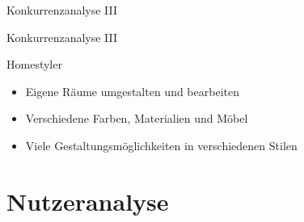 \documentclass[presentation,bigger,aspectratio=169]{beamer}
\begin{document}
\begin{frame}[label={sec:org63a1db3}]{Konkurrenzanalyse III}
\end{frame}
\begin{frame}[label={sec:orgee51e5f}]{Konkurrenzanalyse III}
\begin{block}{Homestyler}
\begin{itemize}
\item Eigene Räume umgestalten und bearbeiten
\item Verschiedene Farben, Materialien und Möbel
\item Viele Gestaltungsmöglichkeiten in verschiedenen Stilen
\end{itemize}
\end{block}
\end{frame}
\section{Nutzeranalyse}
\label{sec:orgcd3d92f}
\begin{frame}[label={sec:orgd04fef0}]{\vspace{2.2cm}\begin{center}\MakeUppercase{\insertsection}\end{center}}
\end{frame}
\end{document}

